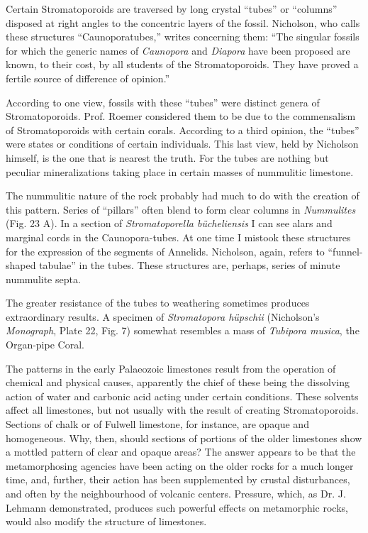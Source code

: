 \documentclass[a4paper, 12pt, oneside, landscape]{article}
\begin{document}
Certain Stromatoporoids are traversed by long crystal ``tubes'' or ``columns'' disposed at right angles to the concentric layers of the fossil. Nicholson, who calls these structures ``Caunoporatubes,'' writes concerning them: ``The singular fossils for which the generic names of \emph{Caunopora} and \emph{Diapora} have been proposed are known, to their cost, by all students of the Stromatoporoids. They have proved a fertile source of difference of opinion.''

According to one view, fossils with these ``tubes'' were distinct genera of Stromatoporoids. Prof. Roemer considered them to be due to the commensalism of Stromatoporoids with certain corals. According to a third opinion, the ``tubes'' were states or conditions of certain individuals. This last view, held by Nicholson himself, is the one that is nearest the truth. For the tubes are nothing but peculiar mineralizations taking place in certain masses of nummulitic limestone.

The nummulitic nature of the rock probably had much to do with the creation of this pattern. Series of ``pillars'' often blend to form clear columns in \emph{Nummulites} (Fig. 23 A). In a section of \emph{Stromatoporella bücheliensis} I can see alars and marginal cords in the Caunopora-tubes. At one time I mistook these structures for the expression of the segments of Annelids. Nicholson, again, refers to ``funnel-shaped tabulae'' in the tubes. These structures are, perhaps, series of minute nummulite septa.

The greater resistance of the tubes to weathering sometimes produces extraordinary results. A specimen of \emph{Stromatopora hüpschii} (Nicholson's \emph{Monograph}, Plate 22, Fig. 7) somewhat resembles a mass of \emph{Tubipora musica}, the Organ-pipe Coral.

The patterns in the early Palaeozoic limestones result from the operation of chemical and physical causes, apparently the chief of these being the dissolving action of water and carbonic acid acting under certain conditions. These solvents affect all limestones, but not usually with the result of creating Stromatoporoids. Sections of chalk or of Fulwell limestone, for instance, are opaque and homogeneous. Why, then, should sections of portions of the older limestones show a mottled pattern of clear and opaque areas? The answer appears to be that the metamorphosing agencies have been acting on the older rocks for a much longer time, and, further, their action has been supplemented by crustal disturbances, and often by the neighbourhood of volcanic centers. Pressure, which, as Dr. J. Lehmann demonstrated, produces such powerful effects on metamorphic rocks, would also modify the structure of limestones.
\end{document}
